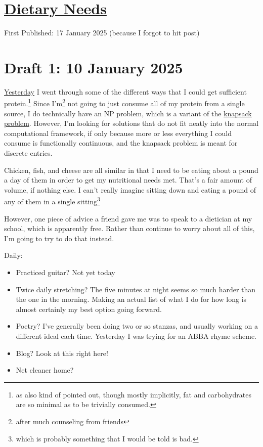 \documentclass[12pt]{article}[titlepage]
\renewcommand{\,}{\textsuperscript{,}}
\begin{document}
\doublespacing
\section{\href{dietary-needs-3.html}{Dietary Needs}}

First Published: 17 January 2025 (because I forgot to hit post)




\section{Draft 1: 10 January 2025}  
\href{dietary-needs-2}{Yesterday} I went through some of the different ways that I could get sufficient protein.\footnote{as also kind of pointed out, though mostly implicitly, fat and carbohydrates are so minimal as to be trivially consumed.}  
Since I'm\footnote{after much counseling from friends} not going to just consume all of my protein from a single source, I do technically have an NP problem, which is a variant of the \href{https://en.wikipedia.org/wiki/Knapsack\_problem}{knapsack problem}.  
However, I'm looking for solutions that do not fit neatly into the normal computational framework, if only because more or less everything I could consume is functionally continuous, and the knapsack problem is meant for discrete entries.

Chicken, fish, and cheese are all similar in that I need to be eating about a pound a day of them in order to get my nutritional needs met.  
That's a fair amount of volume, if nothing else.  
I can't really imagine sitting down and eating a pound of any of them in a single sitting\footnote{which is probably something that I would be told is bad.}

However, one piece of advice a friend gave me was to speak to a dietician at my school, which is apparently free.  
Rather than continue to worry about all of this, I'm going to try to do that instead.

Daily:  
\begin{itemize}  
\item Practiced guitar? Not yet today  
\item Twice daily stretching? The five minutes at night seems so much harder than the one in the morning. Making an actual list of what I do for how long is almost certainly my best option going forward.  
\item Poetry? I've generally been doing two or so stanzas, and usually working on a different ideal each time. Yesterday I was trying for an ABBA rhyme scheme.  
\item Blog? Look at this right here!  
\item Net cleaner home?  
\end{itemize}
\end{document}
